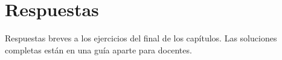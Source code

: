 \chapter{Respuestas}
\label{sec:answers}

Respuestas breves a los ejercicios del final de los capítulos. Las soluciones completas están en una guía aparte para docentes.























